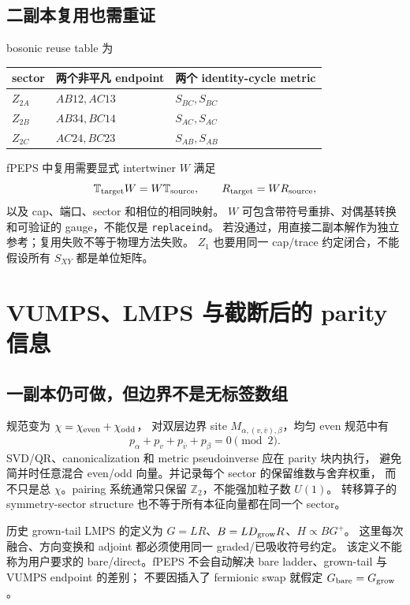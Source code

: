 \documentclass[11pt]{article}
\newcommand{\code}[1]{\texttt{\small #1}}
\begin{document}
\subsection{二副本复用也需重证}

bosonic reuse table 为
\begin{center}
\begin{tabular}{lll}\toprule
sector & 两个非平凡 endpoint & 两个 identity-cycle metric\\\midrule
$Z_{2A}$ & $AB12,AC13$ & $S_{BC},S_{BC}$\\
$Z_{2B}$ & $AB34,BC14$ & $S_{AC},S_{AC}$\\
$Z_{2C}$ & $AC24,BC23$ & $S_{AB},S_{AB}$\\\bottomrule
\end{tabular}
\end{center}
fPEPS 中复用需要显式 intertwiner $W$ 满足
\begin{equation}
 \mathbb T_{\rm target}W=W\mathbb T_{\rm source},\qquad
 R_{\rm target}=WR_{\rm source},\label{eq:reuse}
\end{equation}
以及 cap、端口、sector 和相位的相同映射。
$W$ 可包含带符号重排、对偶基转换和可验证的 gauge，不能仅是 \code{replaceind}。
若没通过，用直接二副本解作为独立参考；复用失败不等于物理方法失败。
$Z_1$ 也要用同一 cap/trace 约定闭合，不能假设所有 $S_{XY}$ 都是单位矩阵。

\section{VUMPS、LMPS 与截断后的 parity 信息}
\subsection{一副本仍可做，但边界不是无标签数组}

规范变为 $\chi=\chi_{\rm even}+\chi_{\rm odd}$，
对双层边界 site $M_{\alpha,(v,\bar v),\beta}$，均匀 even 规范中有
\begin{equation}
 p_\alpha+p_v+p_{\bar v}+p_\beta=0\pmod2.
\end{equation}
SVD/QR、canonicalization 和 metric pseudoinverse 应在 parity 块内执行，
避免简并时任意混合 even/odd 向量。并记录每个 sector 的保留维数与舍弃权重，
而不只是总 $\chi$。pairing 系统通常只保留 $\mathbb Z_2$，不能强加粒子数 $U(1)$。
转移算子的 symmetry-sector structure 也不等于所有本征向量都在同一个 sector。

历史 grown-tail LMPS 的定义为
$G=LR$、$B=L D_{\rm grow}R$、$H\propto BG^+$。
这里每次融合、方向变换和 adjoint 都必须使用同一 graded/已吸收符号约定。
该定义不能称为用户要求的 bare/direct。fPEPS 不会自动解决
bare ladder、grown-tail 与 VUMPS endpoint 的差别；
不要因插入了 fermionic swap 就假定 $G_{\rm bare}=G_{\rm grow}$。
\end{document}
